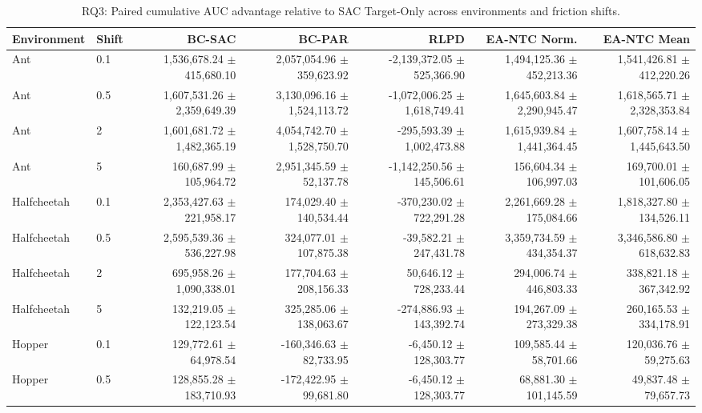 \begin{table}[htbp]
\centering
\caption{RQ3: Paired cumulative AUC advantage relative to SAC Target-Only across environments and friction shifts.}
\label{tab:rq3_paired_auc}
\scriptsize
\setlength{\tabcolsep}{4pt}
\begin{adjustbox}{max width=\textwidth}
\begin{tabular}{llrrrrr}
\toprule
\textbf{Environment} & \textbf{Shift} & \textbf{BC-SAC} & \textbf{BC-PAR} & \textbf{RLPD} & \textbf{EA-NTC Norm.} & \textbf{EA-NTC Mean} \\
\midrule
Ant & 0.1 & 1,536,678.24 $\pm$ 415,680.10 & 2,057,054.96 $\pm$ 359,623.92 & -2,139,372.05 $\pm$ 525,366.90 & 1,494,125.36 $\pm$ 452,213.36 & 1,541,426.81 $\pm$ 412,220.26 \\
Ant & 0.5 & 1,607,531.26 $\pm$ 2,359,649.39 & 3,130,096.16 $\pm$ 1,524,113.72 & -1,072,006.25 $\pm$ 1,618,749.41 & 1,645,603.84 $\pm$ 2,290,945.47 & 1,618,565.71 $\pm$ 2,328,353.84 \\
Ant & 2 & 1,601,681.72 $\pm$ 1,482,365.19 & 4,054,742.70 $\pm$ 1,528,750.70 & -295,593.39 $\pm$ 1,002,473.88 & 1,615,939.84 $\pm$ 1,441,364.45 & 1,607,758.14 $\pm$ 1,445,643.50 \\
Ant & 5 & 160,687.99 $\pm$ 105,964.72 & 2,951,345.59 $\pm$ 52,137.78 & -1,142,250.56 $\pm$ 145,506.61 & 156,604.34 $\pm$ 106,997.03 & 169,700.01 $\pm$ 101,606.05 \\
\midrule
Halfcheetah & 0.1 & 2,353,427.63 $\pm$ 221,958.17 & 174,029.40 $\pm$ 140,534.44 & -370,230.02 $\pm$ 722,291.28 & 2,261,669.28 $\pm$ 175,084.66 & 1,818,327.80 $\pm$ 134,526.11 \\
Halfcheetah & 0.5 & 2,595,539.36 $\pm$ 536,227.98 & 324,077.01 $\pm$ 107,875.38 & -39,582.21 $\pm$ 247,431.78 & 3,359,734.59 $\pm$ 434,354.37 & 3,346,586.80 $\pm$ 618,632.83 \\
Halfcheetah & 2 & 695,958.26 $\pm$ 1,090,338.01 & 177,704.63 $\pm$ 208,156.33 & 50,646.12 $\pm$ 728,233.44 & 294,006.74 $\pm$ 446,803.33 & 338,821.18 $\pm$ 367,342.92 \\
Halfcheetah & 5 & 132,219.05 $\pm$ 122,123.54 & 325,285.06 $\pm$ 138,063.67 & -274,886.93 $\pm$ 143,392.74 & 194,267.09 $\pm$ 273,329.38 & 260,165.53 $\pm$ 334,178.91 \\
\midrule
Hopper & 0.1 & 129,772.61 $\pm$ 64,978.54 & -160,346.63 $\pm$ 82,733.95 & -6,450.12 $\pm$ 128,303.77 & 109,585.44 $\pm$ 58,701.66 & 120,036.76 $\pm$ 59,275.63 \\
Hopper & 0.5 & 128,855.28 $\pm$ 183,710.93 & -172,422.95 $\pm$ 99,681.80 & -6,450.12 $\pm$ 128,303.77 & 68,881.30 $\pm$ 101,145.59 & 49,837.48 $\pm$ 79,657.73 \\

\end{tabular}
\end{adjustbox}
\end{table}
